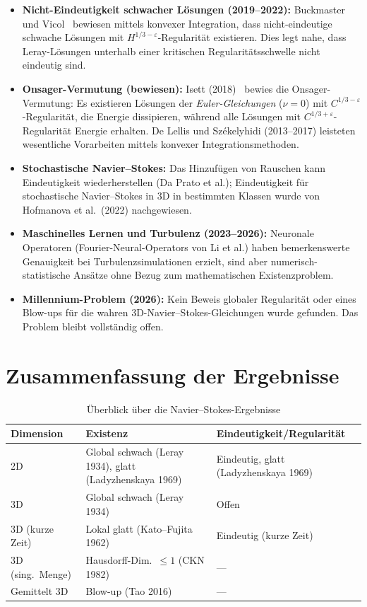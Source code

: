 \documentclass[12pt,a4paper]{article}
\theoremstyle{remark}
\begin{document}
\begin{itemize}[nosep]
  \item \textbf{Nicht-Eindeutigkeit schwacher Lösungen (2019--2022):} Buckmaster und
    Vicol~\cite{BuckmasterVicol2019} bewiesen mittels konvexer Integration, dass
    nicht-eindeutige schwache Lösungen mit $H^{1/3-\varepsilon}$-Regularität existieren.
    Dies legt nahe, dass Leray-Lösungen unterhalb einer kritischen Regularitätsschwelle
    nicht eindeutig sind.
  \item \textbf{Onsager-Vermutung (bewiesen):} Isett (2018)~\cite{DeLellis2019}
    bewies die Onsager-Vermutung: Es existieren Lösungen der \emph{Euler-Gleichungen}
    ($\nu=0$) mit $C^{1/3-\varepsilon}$-Regularität, die Energie dissipieren, während alle
    Lösungen mit $C^{1/3+\varepsilon}$-Regularität Energie erhalten. De Lellis und
    Székelyhidi (2013--2017) leisteten wesentliche Vorarbeiten mittels konvexer
    Integrationsmethoden.
  \item \textbf{Stochastische Navier--Stokes:} Das Hinzufügen von Rauschen kann
    Eindeutigkeit wiederherstellen (Da Prato et al.); Eindeutigkeit für stochastische
    Navier--Stokes in 3D in bestimmten Klassen wurde von Hofmanova et al.\ (2022)
    nachgewiesen.
  \item \textbf{Maschinelles Lernen und Turbulenz (2023--2026):} Neuronale Operatoren
    (Fourier-Neural-Operators von Li et al.) haben bemerkenswerte Genauigkeit bei
    Turbulenzsimulationen erzielt, sind aber numerisch-statistische Ansätze ohne Bezug
    zum mathematischen Existenzproblem.
  \item \textbf{Millennium-Problem (2026):} Kein Beweis globaler Regularität oder eines
    Blow-ups für die wahren 3D-Navier--Stokes-Gleichungen wurde gefunden. Das Problem
    bleibt vollständig offen.
\end{itemize}

\section{Zusammenfassung der Ergebnisse}

\begin{table}[h]
\centering
\begin{tabular}{lll}
\toprule
Dimension & Existenz & Eindeutigkeit/Regularität \\
\midrule
2D & Global schwach (Leray 1934), glatt (Ladyzhenskaya 1969) & Eindeutig, glatt (Ladyzhenskaya 1969) \\
3D & Global schwach (Leray 1934) & Offen \\
3D (kurze Zeit) & Lokal glatt (Kato--Fujita 1962) & Eindeutig (kurze Zeit) \\
3D (sing.\ Menge) & Hausdorff-Dim.\ $\leq 1$ (CKN 1982) & --- \\
Gemittelt 3D & Blow-up (Tao 2016) & --- \\
\bottomrule
\end{tabular}
\caption{Überblick über die Navier--Stokes-Ergebnisse}
\end{table}
\end{document}
